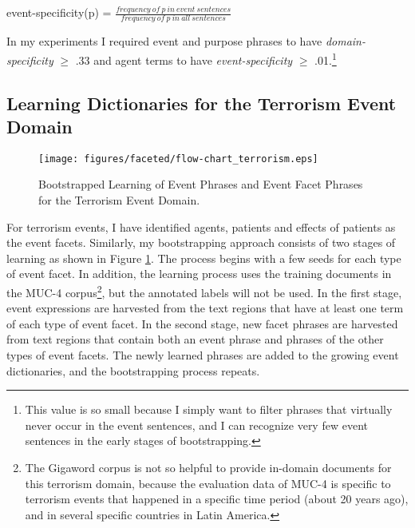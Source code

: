 \begin{center}
{\small event-specificity(p) = $\frac {frequency~of~p~in
     ~event~sentences}{frequency~of~p~in~all~sentences}$}
\end{center}

In my experiments I required event and purpose phrases to have {\it
  domain-specificity} $\geq$ .33 and agent terms to have {\it
  event-specificity} $\geq$ .01.\footnote{This value is so small because
  I simply want to filter phrases that virtually  never occur in the
  event sentences, and I can recognize very few event sentences in
  the early stages of bootstrapping.}


\subsection{Learning Dictionaries for the Terrorism Event Domain}

\begin{figure}[htbp]
 \centering
 \texttt{[image: figures/faceted/flow-chart\_terrorism.eps]}
 \caption{Bootstrapped Learning of Event Phrases and Event Facet Phrases for the Terrorism Event Domain.}
\label{chap5:multi_faceted_flow_chart_ter}
\end{figure} 

For terrorism events, 
I have identified agents, patients and effects of patients as the event facets.
Similarly, my bootstrapping approach consists of two stages of learning as shown
in Figure \ref{chap5:multi_faceted_flow_chart_ter}.  The process begins with a few
seeds for each type of event facet. 
In addition, the learning process uses the training documents in the 
MUC-4 corpus\footnote{The Gigaword corpus is not so helpful to provide 
in-domain documents for 
this terrorism domain, because the evaluation data 
of MUC-4 is specific to terrorism events that happened 
in a specific time period (about 20 years ago), and in several specific countries in 
Latin America.}, but the annotated labels will not be used.
In the first stage, event expressions are harvested from the text regions that
have at least one term of each type of event facet. 
In the second stage, 
new facet phrases are harvested from text regions that 
contain both an event phrase and phrases of the other types of event facets.
The newly learned phrases are added to the growing event dictionaries, and the 
bootstrapping process repeats. 

